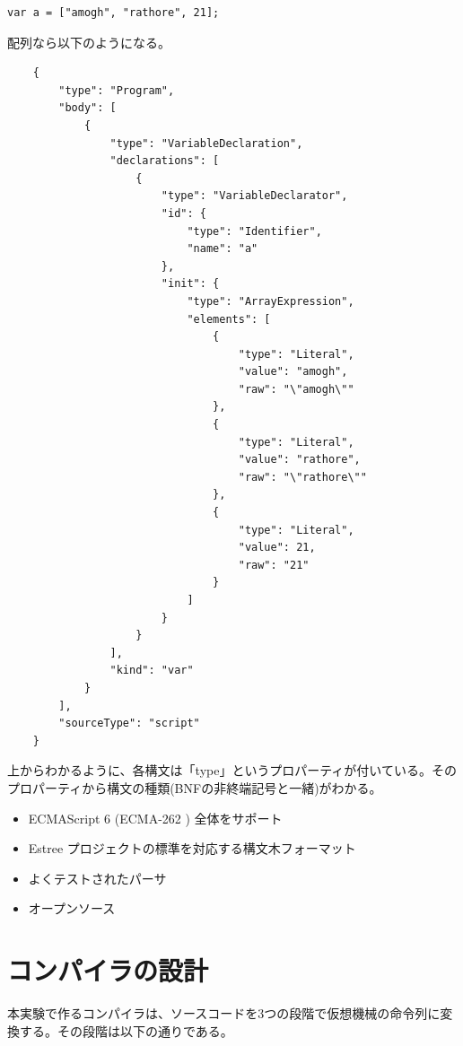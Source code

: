 \documentclass[12pt]{article}
\begin{document}
\begin{lstlisting}
var a = ["amogh", "rathore", 21];
\end{lstlisting}
\FloatBarrier

配列なら以下のようになる。

\begin{lstlisting}
	{
	    "type": "Program",
	    "body": [
	        {
	            "type": "VariableDeclaration",
	            "declarations": [
	                {
	                    "type": "VariableDeclarator",
	                    "id": {
	                        "type": "Identifier",
	                        "name": "a"
	                    },
	                    "init": {
	                        "type": "ArrayExpression",
	                        "elements": [
	                            {
	                                "type": "Literal",
	                                "value": "amogh",
	                                "raw": "\"amogh\""
	                            },
	                            {
	                                "type": "Literal",
	                                "value": "rathore",
	                                "raw": "\"rathore\""
	                            },
	                            {
	                                "type": "Literal",
	                                "value": 21,
	                                "raw": "21"
	                            }
	                        ]
	                    }
	                }
	            ],
	            "kind": "var"
	        }
	    ],
	    "sourceType": "script"
	}
\end{lstlisting}
\FloatBarrier

上からわかるように、各構文は「type」というプロパーティが付いている。そのプロパーティから構文の種類(BNFの非終端記号と一緒)がわかる。

\begin{itemize}
\item ECMAScript 6 (ECMA-262 \cite{ecmascript}) 全体をサポート
\item Estree プロジェクトの標準を対応する構文木フォーマット
\item よくテストされたパーサ \cite{esprimaTests}
\item オープンソース \cite{esprimaGitHub}
\end{itemize}

\section{コンパイラの設計}
本実験で作るコンパイラは、ソースコードを3つの段階で仮想機械の命令列に変換する。その段階は以下の通りである。
\end{document}
